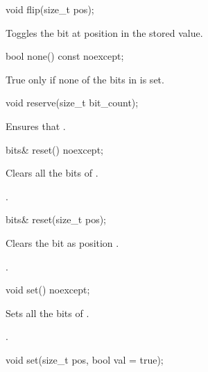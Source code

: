 \begin{addedblock}
\begin{itemdecl}
void flip(size_t pos);
\end{itemdecl}

\begin{itemdescr}
\effects Toggles the bit at position  in the stored value.
\end{itemdescr}

\begin{itemdecl}
bool none() const noexcept;
\end{itemdecl}

\begin{itemdescr}
\returns True only if none of the bits in  is set.
\end{itemdescr}

\begin{itemdecl}
void reserve(size_t bit_count);
\end{itemdecl}

\begin{itemdescr}
\effects Ensures that .
\end{itemdescr}

\begin{itemdecl}
bits& reset() noexcept;
\end{itemdecl}

\begin{itemdescr}
\effects Clears all the bits of .

\returns {}.
\end{itemdescr}

\begin{itemdecl}
bits& reset(size_t pos);
\end{itemdecl}

\begin{itemdescr}
\effects Clears the bit as position .

\returns {}.
\end{itemdescr}

\begin{itemdecl}
void set() noexcept;
\end{itemdecl}

\begin{itemdescr}
\effects Sets all the bits of .

.
\end{itemdescr}

\begin{itemdecl}
void set(size_t pos, bool val = true);
\end{itemdecl}


\end{addedblock}
